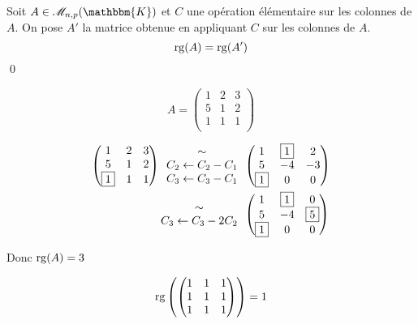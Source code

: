 \begin{prop}
	Soit $A \in \mathcal{M}_{n,p}(\mathbbm{K})$ et $C$ une opération élémentaire sur les colonnes de $A$. On pose $A'$ la matrice obtenue en appliquant $C$ sur les colonnes de $A$.
	\[
		\operatorname{rg}(A) = \operatorname{rg}(A')
	\] \qed
\end{prop}

\begin{exm}
	\[
		A = \begin{pmatrix}
			1&2&3\\
			5&1&2\\
			1&1&1\\
		\end{pmatrix}
	\]

	\begin{align*}
		\begin{pmatrix}
			1&2&3\\
			5&1&2\\
			\boxed 1&1&1\\
		\end{pmatrix}
		\begin{array}{c}
			\sim\\
			C_2 \leftarrow C_2 - C_1\\
			C_3 \leftarrow C_3 - C_1
		\end{array}&
		\begin{pmatrix}
			1&\boxed 1&2\\
			5&-4&-3\\
			\boxed 1 & 0 & 0
		\end{pmatrix} \\
		\begin{array}{c}
			\sim\\
			C_3 \leftarrow C_3 - 2C_2
		\end{array}&
		\begin{pmatrix}
			1&\boxed 1 & 0\\
			5 & -4 &\boxed 5\\
			\boxed 1 & 0 & 0
		\end{pmatrix} 
	\end{align*}

	Donc $\operatorname{rg}(A) = 3$
\end{exm}

\begin{exm}
	\[
		\operatorname{rg} \left( \begin{pmatrix}
			1&1&1\\
			1&1&1\\
			1&1&1\\
		\end{pmatrix} \right)  = 1
	\] 
\end{exm}

